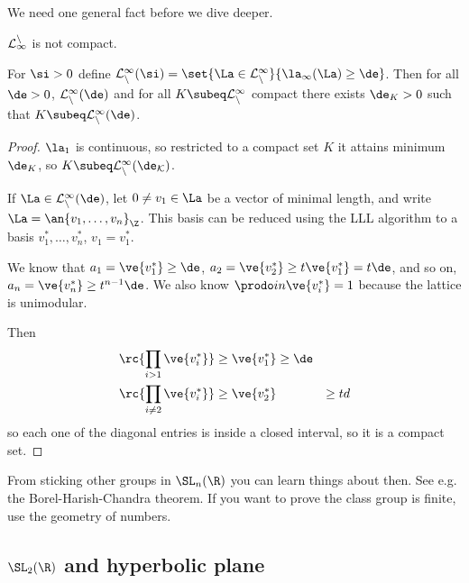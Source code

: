 

We need one general fact before we dive deeper.

$\cal L_1^n$ is not compact. 

\begin{lem}
For $\si>0$ define $\cal L_n^1(\si)= \set{\La\in \cal L_n^1}{\la_1(\La) \ge \de}$. Then for all $\de>0$, $\cal L_n^1(\de)$ and for all $K\subeq \cal L_n^1$ compact there exists $\de_K>0$ such that $K\subeq \cal L_n^1(\de)$. 
\end{lem}
\begin{proof}
$\la_1$ is continuous, so restricted to a compact set $K$ it attains minimum $\de_K$, so $K\subeq \cal L_n^1(\de_K)$.

If $\La\in \cal L_n^1(\de)$, let $0\ne v_1\in \La$ be a vector of minimal length, and write $\La = \an{v_1,\ldots, v_n}_\Z$. %
This basis can be reduced using the LLL algorithm to a basis $v_1^*,\ldots, v_n^*$, $v_1=v_1^*$. 

We know that $a_1=\ve{v_1^*}\ge \de$, $a_2=\ve{v_2^*}\ge t \ve{v_1^*} = t\de$, and so on, $a_n=\ve{v_n^*}\ge t^{n-1}\de$.  %
We also know $\prodo in \ve{v_i^*}=1$ because the lattice is unimodular.

Then 
\begin{align}
\rc{\prod_{i>1} \ve{v_i^*}}&\ge \ve{v_1^*}\ge \de\\
\rc{\prod_{i\ne 2} \ve{v_i^*}}&\ge 
\ve{v_2^*} &\ge td
\end{align}
so each one of the diagonal entries is inside a closed interval, so it is a compact set.
\end{proof}
From sticking other groups in $\SL_n(\R)$ you can learn things about then. See e.g. the Borel-Harish-Chandra theorem. If you want to prove the class group is finite, use the geometry of numbers.

\subsection{$\SL_2(\R)$ and hyperbolic plane}

